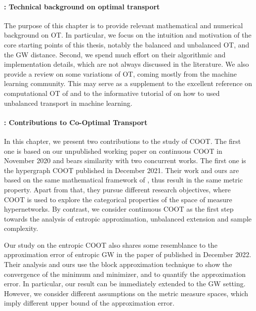 \paragraph{ : Technical background on optimal transport}

The purpose of this chapter is to provide relevant mathematical and numerical background
on OT. In particular, we focus on the intuition and motivation of the core starting points
of this thesis, notably the balanced and unbalanced OT, and the GW distance.
Second, we spend much effort on their algorithmic and implementation details, which are not
always discussed in the literature. We also provide a review on some variations of OT,
coming mostly from the machine learning community. This may serve as a supplement
to the excellent reference on computational OT of \citet{Peyre19} and to the informative
tutorial of \citet{Sejourne22} on how to used unbalanced transport in machine learning.

\paragraph{: Contributions to Co-Optimal Transport}

In this chapter, we present two contributions to the study of COOT.
The first one is based on our unpublished working paper
on continuous COOT in November 2020 and bears similarity with two concurrent works.
The first one is the hypergraph COOT \citep{Chowdhury21b} published in December 2021.
Their work and ours are based on the same mathematical framework of \citet{Chowdhury19},
thus result in the same metric property. Apart from that, they pursue different research objectives,
where COOT is used to explore the categorical properties of the space of measure hypernetworks.
By contrast, we consider continuous COOT as the first step towards the analysis of
entropic approximation, unbalanced extension and sample complexity.

Our study on the entropic COOT also shares some resemblance to the approximation error of
entropic GW in the paper of \citet{Zhang23} published in December 2022.
Their analysis and ours use the block approximation technique \citep{Carlier17}
to show the convergence of the minimum and minimizer, and to quantify the approximation error.
In particular, our result can be immediately extended to the GW setting. However,
we consider different assumptions on the metric measure spaces,
which imply different upper bound of the approximation error.

